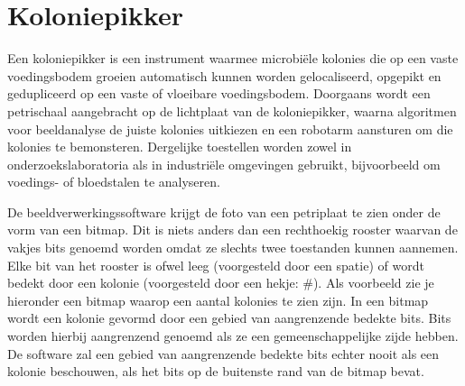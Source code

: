 
\section*{Koloniepikker}
Een koloniepikker is een instrument waarmee microbiële kolonies die op een vaste voedingsbodem groeien automatisch kunnen worden gelocaliseerd, opgepikt en gedupliceerd op een vaste of vloeibare voedingsbodem. Doorgaans wordt een petrischaal aangebracht op de lichtplaat van de koloniepikker, waarna algoritmen voor beeldanalyse de juiste kolonies uitkiezen en een robotarm aansturen om die kolonies te bemonsteren. Dergelijke toestellen worden zowel in onderzoekslaboratoria als in industri\"ele omgevingen gebruikt, bijvoorbeeld om voedings- of bloedstalen te analyseren.

De beeldverwerkingssoftware krijgt de foto van een petriplaat te zien onder de vorm van een bitmap. Dit is niets anders dan een rechthoekig rooster waarvan de vakjes bits genoemd worden omdat ze slechts twee toestanden kunnen aannemen. Elke bit van het rooster is ofwel leeg (voorgesteld door een spatie) of wordt bedekt door een kolonie (voorgesteld door een hekje: \#). Als voorbeeld zie je hieronder een bitmap waarop een aantal kolonies te zien zijn. In een bitmap wordt een kolonie gevormd door een gebied van aangrenzende bedekte bits. Bits worden hierbij aangrenzend genoemd als ze een gemeenschappelijke zijde hebben. De software zal een gebied van aangrenzende bedekte bits echter nooit als een kolonie beschouwen, als het bits op de buitenste rand van de bitmap bevat.

